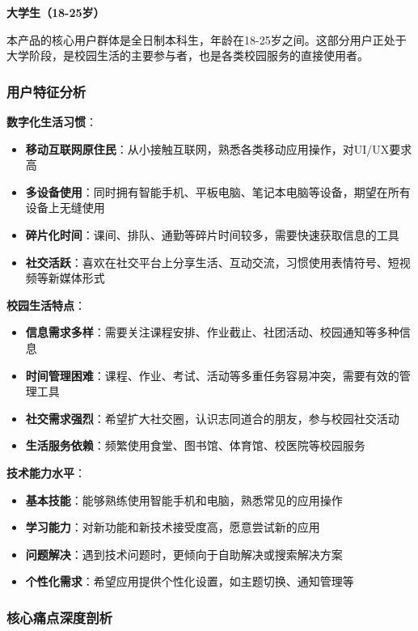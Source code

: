 \documentclass[12pt,a4paper]{article}
\begin{document}
\textbf{大学生（18-25岁）}

本产品的核心用户群体是全日制本科生，年龄在18-25岁之间。这部分用户正处于大学阶段，是校园生活的主要参与者，也是各类校园服务的直接使用者。

\subsubsection{用户特征分析}

\textbf{数字化生活习惯}：
\begin{itemize}
    \item \textbf{移动互联网原住民}：从小接触互联网，熟悉各类移动应用操作，对UI/UX要求高
    \item \textbf{多设备使用}：同时拥有智能手机、平板电脑、笔记本电脑等设备，期望在所有设备上无缝使用
    \item \textbf{碎片化时间}：课间、排队、通勤等碎片时间较多，需要快速获取信息的工具
    \item \textbf{社交活跃}：喜欢在社交平台上分享生活、互动交流，习惯使用表情符号、短视频等新媒体形式
\end{itemize}

\textbf{校园生活特点}：
\begin{itemize}
    \item \textbf{信息需求多样}：需要关注课程安排、作业截止、社团活动、校园通知等多种信息
    \item \textbf{时间管理困难}：课程、作业、考试、活动等多重任务容易冲突，需要有效的管理工具
    \item \textbf{社交需求强烈}：希望扩大社交圈，认识志同道合的朋友，参与校园社交活动
    \item \textbf{生活服务依赖}：频繁使用食堂、图书馆、体育馆、校医院等校园服务
\end{itemize}

\textbf{技术能力水平}：
\begin{itemize}
    \item \textbf{基本技能}：能够熟练使用智能手机和电脑，熟悉常见的应用操作
    \item \textbf{学习能力}：对新功能和新技术接受度高，愿意尝试新的应用
    \item \textbf{问题解决}：遇到技术问题时，更倾向于自助解决或搜索解决方案
    \item \textbf{个性化需求}：希望应用提供个性化设置，如主题切换、通知管理等
\end{itemize}

\subsubsection{核心痛点深度剖析}
\end{document}
